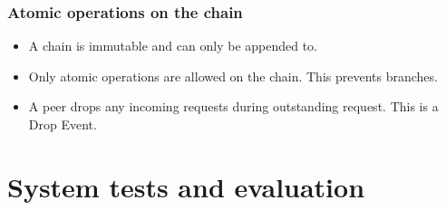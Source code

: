 \documentclass{beamer}
\begin{document}
\begin{frame}
\frametitle{Atomic operations on the chain}
    \begin{itemize}
        \item A chain is immutable and can only be appended to.
        \item Only atomic operations are allowed on the chain. This prevents branches.
        \item A peer drops any incoming requests during outstanding request. This is a Drop Event.
    \end{itemize}
\end{frame}

\section{System tests and evaluation}
\end{document}
